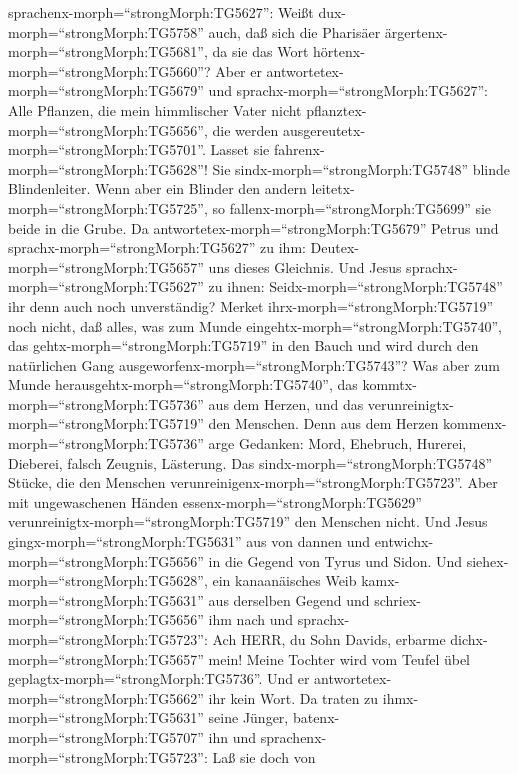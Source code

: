 sprachenx-morph=``strongMorph:TG5627'': Weißt
dux-morph=``strongMorph:TG5758'' auch, daß sich die Pharisäer
ärgertenx-morph=``strongMorph:TG5681'', da sie das Wort
hörtenx-morph=``strongMorph:TG5660''?  Aber er
antwortetex-morph=``strongMorph:TG5679'' und
sprachx-morph=``strongMorph:TG5627'': Alle Pflanzen, die mein
himmlischer Vater nicht pflanztex-morph=``strongMorph:TG5656'', die
werden ausgereutetx-morph=``strongMorph:TG5701''.  Lasset
sie fahrenx-morph=``strongMorph:TG5628''! Sie
sindx-morph=``strongMorph:TG5748'' blinde Blindenleiter. Wenn aber ein
Blinder den andern leitetx-morph=``strongMorph:TG5725'', so
fallenx-morph=``strongMorph:TG5699'' sie beide in die Grube.
 Da antwortetex-morph=``strongMorph:TG5679'' Petrus und
sprachx-morph=``strongMorph:TG5627'' zu ihm:
Deutex-morph=``strongMorph:TG5657'' uns dieses Gleichnis. 
Und Jesus sprachx-morph=``strongMorph:TG5627'' zu ihnen:
Seidx-morph=``strongMorph:TG5748'' ihr denn auch noch unverständig?
 Merket ihrx-morph=``strongMorph:TG5719'' noch nicht, daß
alles, was zum Munde eingehtx-morph=``strongMorph:TG5740'', das
gehtx-morph=``strongMorph:TG5719'' in den Bauch und wird durch den
natürlichen Gang ausgeworfenx-morph=``strongMorph:TG5743''?
 Was aber zum Munde
herausgehtx-morph=``strongMorph:TG5740'', das
kommtx-morph=``strongMorph:TG5736'' aus dem Herzen, und das
verunreinigtx-morph=``strongMorph:TG5719'' den Menschen. 
Denn aus dem Herzen kommenx-morph=``strongMorph:TG5736'' arge Gedanken:
Mord, Ehebruch, Hurerei, Dieberei, falsch Zeugnis, Lästerung.
 Das sindx-morph=``strongMorph:TG5748'' Stücke, die den
Menschen verunreinigenx-morph=``strongMorph:TG5723''. Aber mit
ungewaschenen Händen essenx-morph=``strongMorph:TG5629''
verunreinigtx-morph=``strongMorph:TG5719'' den Menschen nicht.
 Und Jesus gingx-morph=``strongMorph:TG5631'' aus von
dannen und entwichx-morph=``strongMorph:TG5656'' in die Gegend von Tyrus
und Sidon.  Und siehex-morph=``strongMorph:TG5628'', ein
kanaanäisches Weib kamx-morph=``strongMorph:TG5631'' aus derselben
Gegend und schriex-morph=``strongMorph:TG5656'' ihm nach und
sprachx-morph=``strongMorph:TG5723'': Ach HERR, du Sohn Davids, erbarme
dichx-morph=``strongMorph:TG5657'' mein! Meine Tochter wird vom Teufel
übel geplagtx-morph=``strongMorph:TG5736''.  Und er
antwortetex-morph=``strongMorph:TG5662'' ihr kein Wort. Da traten zu
ihmx-morph=``strongMorph:TG5631'' seine Jünger,
batenx-morph=``strongMorph:TG5707'' ihn und
sprachenx-morph=``strongMorph:TG5723'': Laß sie doch von
